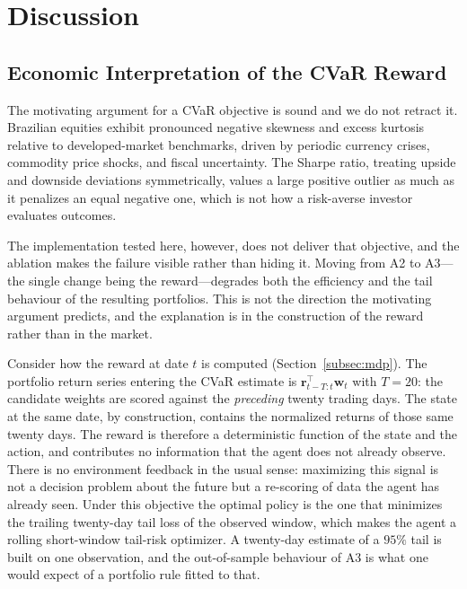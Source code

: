 \section{Discussion}
\label{sec:discussion}

\subsection{Economic Interpretation of the CVaR Reward}
\label{subsec:disc_cvar}

The motivating argument for a CVaR objective is sound and we do not retract it.
Brazilian equities exhibit pronounced negative skewness and excess kurtosis
relative to developed-market benchmarks, driven by periodic currency crises,
commodity price shocks, and fiscal uncertainty.
The Sharpe ratio, treating upside and downside deviations symmetrically, values a
large positive outlier as much as it penalizes an equal negative one, which is not
how a risk-averse investor evaluates outcomes.

The implementation tested here, however, does not deliver that objective, and the
ablation makes the failure visible rather than hiding it.
Moving from A2 to A3---the single change being the reward---degrades both the
efficiency and the tail behaviour of the resulting portfolios.
This is not the direction the motivating argument predicts, and the explanation is
in the construction of the reward rather than in the market.

Consider how the reward at date $t$ is computed (Section~\ref{subsec:mdp}).
The portfolio return series entering the CVaR estimate is
$\mathbf{r}_{t-T:t}^{\top}\mathbf{w}_t$ with $T = 20$: the candidate weights are
scored against the \emph{preceding} twenty trading days.
The state at the same date, by construction, contains the normalized returns of
those same twenty days.
The reward is therefore a deterministic function of the state and the action, and
contributes no information that the agent does not already observe.
There is no environment feedback in the usual sense: maximizing this signal is not
a decision problem about the future but a re-scoring of data the agent has already
seen.
Under this objective the optimal policy is the one that minimizes the trailing
twenty-day tail loss of the observed window, which makes the agent a rolling
short-window tail-risk optimizer.
A twenty-day estimate of a $95\%$ tail is built on one observation, and the
out-of-sample behaviour of A3 is what one would expect of a portfolio rule fitted
to that.

